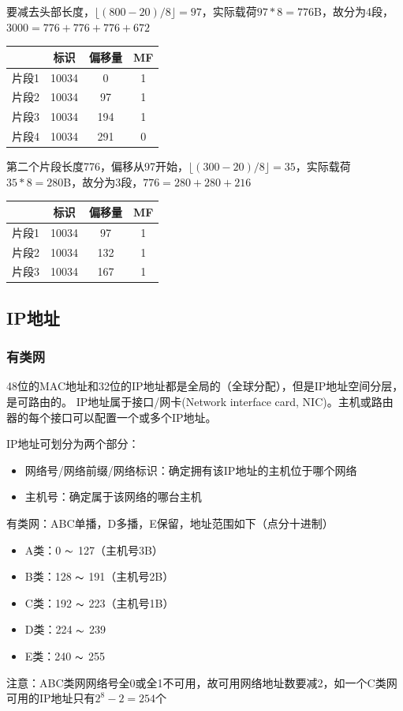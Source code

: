 \begin{analysis}
	要减去头部长度，$\lfloor (800-20)/8\rfloor=97$，实际载荷$97*8=776$B，故分为4段，$3000=776+776+776+672$
\begin{center}
\begin{tabular}{cccc}\hline
	& 标识 & 偏移量 & MF\\\hline
片段1 & 10034 & 0 & 1\\
片段2 & 10034 & 97 & 1\\
片段3 & 10034 & 194 & 1\\
片段4 & 10034 & 291 & 0\\\hline
\end{tabular}
\end{center}
	第二个片段长度776，偏移从97开始，$\lfloor(300-20)/8\rfloor=35$，实际载荷$35*8=280$B，故分为3段，$776=280+280+216$
\begin{center}
\begin{tabular}{cccc}\hline
	& 标识 & 偏移量 & MF\\\hline
片段1 & 10034 & 97 & 1\\
片段2 & 10034 & 132 & 1\\
片段3 & 10034 & 167 & 1\\\hline
\end{tabular}
\end{center}
\end{analysis}

\subsection{IP地址}
\subsubsection{有类网}
48位的MAC地址和32位的IP地址都是全局的（全球分配），但是IP地址空间分层，是可路由的。
IP地址属于接口/网卡(Network interface card, NIC)。主机或路由器的每个接口可以配置一个或多个IP地址。

IP地址可划分为两个部分：
\begin{itemize}
	\item 网络号/网络前缀/网络标识：确定拥有该IP地址的主机位于哪个网络
	\item 主机号：确定属于该网络的哪台主机
\end{itemize}

有类网：ABC单播，D多播，E保留，地址范围如下（点分十进制）
\begin{itemize}
	\item A类：0 $\thicksim$ 127（主机号3B）
	\item B类：128 $\thicksim$ 191（主机号2B）
	\item C类：192 $\thicksim$ 223（主机号1B）
	\item D类：224 $\thicksim$ 239
	\item E类：240 $\thicksim$ 255
\end{itemize}
注意：ABC类网网络号全0或全1不可用，故可用网络地址数要减2，如一个C类网可用的IP地址只有$2^8-2=254$个

